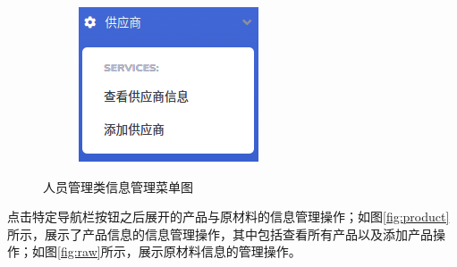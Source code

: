 \begin{figure}[H]
\begin{subfigure}{.25\textwidth}
        \label{fig:customer}
    \end{subfigure}
    \qquad
    \begin{subfigure}{.25\textwidth}
        \centering
        \includegraphics[width=\textwidth]{figures/5supplyer.png}
        \label{fig:suplier}
    \end{subfigure}
    \caption{人员管理类信息管理菜单图}
\end{figure}

点击特定导航栏按钮之后展开的产品与原材料的信息管理操作；如图\ref{fig:product}所示，展示了产品信息的信息管理操作，其中包括查看所有产品以及添加产品操作；如图\ref{fig:raw}所示，展示原材料信息的管理操作。

